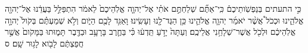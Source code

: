 \documentclass{openreader}
\begin{document}
כִּ֣י התעתים בְּנַפְשֹֽׁותֵיכֶם֒ כִּֽי־אַתֶּ֞ם שְׁלַחְתֶּ֣ם אֹתִ֗י אֶל־יְהוָ֤ה אֱלֹֽהֵיכֶם֙ לֵאמֹ֔ר הִתְפַּלֵּ֣ל בַּעֲדֵ֔נוּ אֶל־יְהוָ֖ה אֱלֹהֵ֑ינוּ וּכְכֹל֩ אֲשֶׁ֨ר יֹאמַ֜ר יְהוָ֧ה אֱלֹהֵ֛ינוּ כֵּ֥ן הַגֶּד־לָ֖נוּ וְעָשִֽׂינוּ׃ 
וָאַגִּ֥ד לָכֶ֖ם הַיֹּ֑ום וְלֹ֣א שְׁמַעְתֶּ֗ם בְּקֹול֙ יְהוָ֣ה אֱלֹֽהֵיכֶ֔ם וּלְכֹ֖ל אֲשֶׁר־שְׁלָחַ֥נִי אֲלֵיכֶֽם׃ 
וְעַתָּה֙ יָדֹ֣עַ תֵּֽדְע֔וּ כִּ֗י בַּחֶ֛רֶב בָּרָעָ֥ב וּבַדֶּ֖בֶר תָּמ֑וּתוּ בַּמָּקֹום֙ אֲשֶׁ֣ר חֲפַצְתֶּ֔ם לָבֹ֖וא לָג֥וּר שָֽׁם׃ ס 
\end{document}
